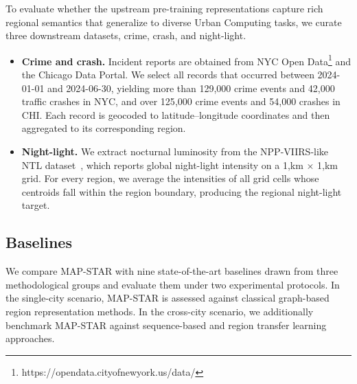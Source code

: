 To evaluate whether the upstream pre-training representations capture rich regional semantics that generalize to diverse Urban Computing tasks, we curate three downstream datasets, crime, crash, and night-light.
\begin{itemize}
    \item \textbf{Crime and crash.} Incident reports are obtained from NYC Open Data\footnote{https://opendata.cityofnewyork.us/data/} and the Chicago Data Portal. We select all records that occurred between 2024-01-01 and 2024-06-30, yielding more than 129{,}000 crime events and 42{,}000 traffic crashes in NYC, and over 125{,}000 crime events and 54{,}000 crashes in CHI. Each record is geocoded to latitude–longitude coordinates and then aggregated to its corresponding region.
    \item \textbf{Night-light.} We extract nocturnal luminosity from the NPP-VIIRS-like NTL dataset~\cite{DVN/YGIVCD_2020}, which reports global night-light intensity on a 1,km × 1,km grid. For every region, we average the intensities of all grid cells whose centroids fall within the region boundary, producing the regional night-light target. 
\end{itemize}



\subsection{Baselines}

We compare MAP-STAR with nine state-of-the-art baselines drawn from three methodological groups and evaluate them under two experimental protocols. In the single-city scenario, MAP-STAR is assessed against classical graph-based region representation methods. In the cross-city scenario, we additionally benchmark MAP-STAR against sequence-based and region transfer learning approaches.

